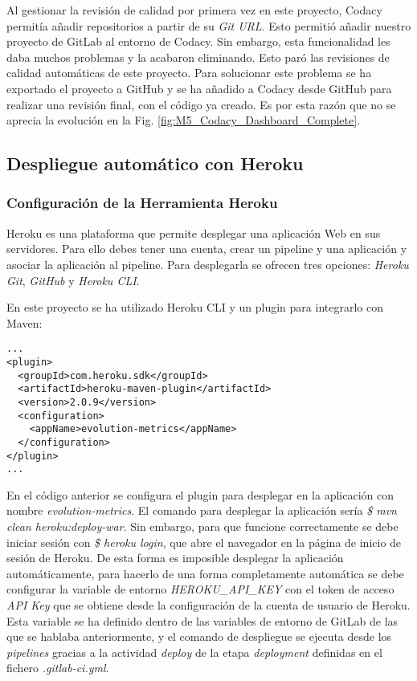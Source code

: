 Al gestionar la revisión de calidad por primera vez en este proyecto, Codacy permitía añadir repositorios a partir de su \textit{Git URL}. Esto permitió añadir nuestro proyecto de GitLab al entorno de Codacy. Sin embargo, esta funcionalidad les daba muchos problemas y la acabaron eliminando. Esto paró las revisiones de calidad automáticas de este proyecto. Para solucionar este problema se ha exportado el proyecto a GitHub y se ha añadido a Codacy desde GitHub para realizar una revisión final, con el código ya creado. Es por esta razón que no se aprecia la evolución en la Fig. \ref{fig:M5_Codacy_Dashboard_Complete}. 

\subsection{Despliegue automático con Heroku}

\subsubsection{Configuración de la Herramienta Heroku}

Heroku es una plataforma que permite desplegar una aplicación Web en sus servidores. Para ello debes tener una cuenta, crear un pipeline y una aplicación y asociar la aplicación al pipeline. Para desplegarla se ofrecen tres opciones: \textit{Heroku Git}, \textit{GitHub} y \textit{Heroku CLI}.

En este proyecto se ha utilizado Heroku CLI y un plugin para integrarlo con Maven:\\
\begin{minipage}{\linewidth}
{\tiny
\begin{lstlisting}[breaklines]
...
<plugin>
  <groupId>com.heroku.sdk</groupId>
  <artifactId>heroku-maven-plugin</artifactId>
  <version>2.0.9</version>
  <configuration>
	<appName>evolution-metrics</appName>
  </configuration>
</plugin>
...
\end{lstlisting}
}
\end{minipage}

En el código anterior se configura el plugin para desplegar en la aplicación con nombre \textit{evolution-metrics}. El comando para  desplegar la aplicación sería \textit{\$ mvn clean heroku:deploy-war}. Sin embargo, para que funcione correctamente se debe iniciar sesión con \textit{\$ heroku login}, que abre el navegador en la página de inicio de sesión de Heroku. De esta forma es imposible desplegar la aplicación automáticamente, para hacerlo de una forma completamente automática se debe configurar la variable de entorno \textit{HEROKU\_API\_KEY} con el token de acceso \textit{API Key} que se obtiene desde la configuración de la cuenta de usuario de Heroku. Esta variable se ha definido dentro de las variables de entorno de GitLab de las que se hablaba anteriormente, y el comando de despliegue se ejecuta desde los \textit{pipelines} gracias a la actividad \textit{deploy} de la etapa \textit{deployment} definidas en el fichero \textit{.gitlab-ci.yml}.

